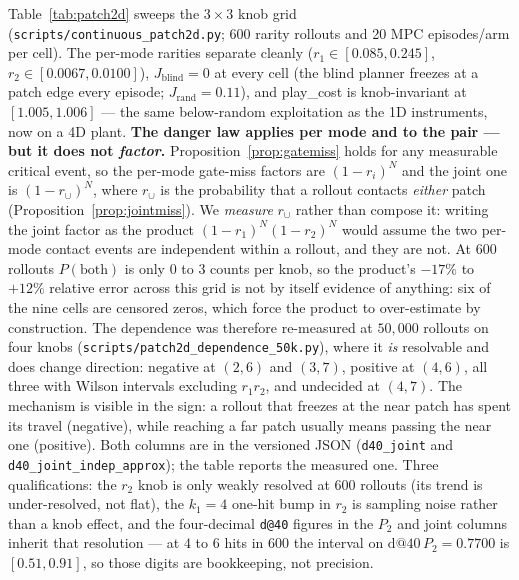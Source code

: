 \documentclass[11pt]{article}
\theoremstyle{definition}
\theoremstyle{remark}
\begin{document}
Table~\ref{tab:patch2d} sweeps the $3\times3$ knob grid (\texttt{scripts/continuous\_patch2d.py}; 600 rarity rollouts and 20 MPC episodes/arm per cell). The per-mode rarities separate cleanly ($r_1 \in [0.085, 0.245]$, $r_2 \in [0.0067, 0.0100]$), $J_\mathrm{blind} = 0$ at every cell (the blind planner freezes at a patch edge every episode; $J_\mathrm{rand} = 0.11$), and play\_cost is knob-invariant at $[1.005, 1.006]$ --- the same below-random exploitation as the 1D instruments, now on a 4D plant. \textbf{The danger law applies per mode and to the pair --- but it does not \emph{factor}.} Proposition~\ref{prop:gatemiss} holds for any measurable critical event, so the per-mode gate-miss factors are $(1-r_i)^N$ and the joint one is $(1-r_\cup)^N$, where $r_\cup$ is the probability that a rollout contacts \emph{either} patch (Proposition~\ref{prop:jointmiss}). We \emph{measure} $r_\cup$ rather than compose it: writing the joint factor as the product $(1-r_1)^N(1-r_2)^N$ would assume the two per-mode contact events are independent within a rollout, and they are not. At 600 rollouts $P(\text{both})$ is only $0$ to $3$ counts per knob, so the product's $-17\%$ to $+12\%$ relative error across this grid is not by itself evidence of anything: six of the nine cells are censored zeros, which force the product to over-estimate by construction. The dependence was therefore re-measured at $50{,}000$ rollouts on four knobs (\texttt{scripts/\allowbreak patch2d\_\allowbreak dependence\_\allowbreak 50k.py}), where it \emph{is} resolvable and does change direction: negative at $(2,6)$ and $(3,7)$, positive at $(4,6)$, all three with Wilson intervals excluding $r_1r_2$, and undecided at $(4,7)$. The mechanism is visible in the sign: a rollout that freezes at the near patch has spent its travel (negative), while reaching a far patch usually means passing the near one (positive). Both columns are in the versioned JSON (\texttt{d40\_joint} and \texttt{d40\_joint\_indep\_approx}); the table reports the measured one. Three qualifications: the $r_2$ knob is only weakly resolved at 600 rollouts (its trend is under-resolved, not flat), the $k_1{=}4$ one-hit bump in $r_2$ is sampling noise rather than a knob effect, and the four-decimal \texttt{d@40} figures in the $P_2$ and joint columns inherit that resolution --- at $4$ to $6$ hits in $600$ the interval on $\mathrm{d@40}\,P_2 = 0.7700$ is $[0.51, 0.91]$, so those digits are bookkeeping, not precision.
\end{document}

